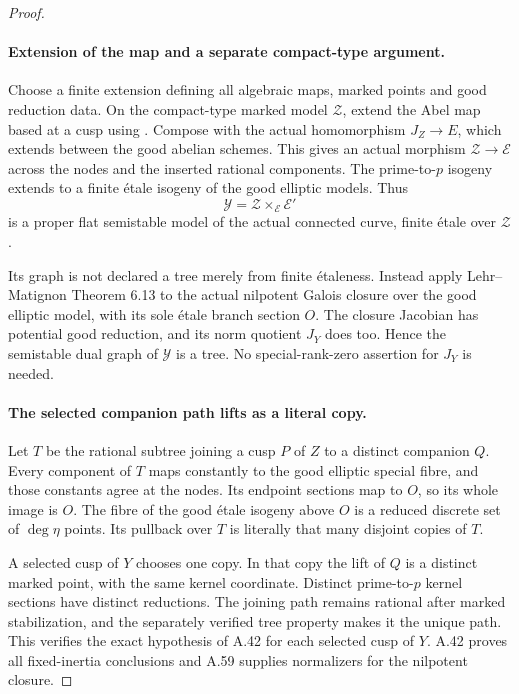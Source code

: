 \begin{proof}
\paragraph{Extension of the map and a separate compact-type argument.}
Choose a finite extension defining all algebraic maps,
marked points and good reduction data. On the compact-type
marked model \(\mathcal Z\), extend the Abel map based
at a cusp using \cite[Theorem 1.1 and Proposition 3.2]{fghDupuyRabinoff}.
Compose with the actual homomorphism \(J_Z\to E\),
which extends between the good abelian schemes. This gives
an actual morphism \(\mathcal Z\to\mathcal E\)
across the nodes and the inserted rational components.
The prime-to-\(p\) isogeny extends to a finite \'etale
isogeny of the good elliptic models. Thus
\[
 \mathcal Y=\mathcal Z\times_{\mathcal E}\mathcal E'
                                                               \tag{A.79.4}
\]
is a proper flat semistable model of the actual connected
curve, finite \'etale over \(\mathcal Z\).

Its graph is not declared a tree merely from finite
\'{e}taleness. Instead apply Lehr--Matignon Theorem 6.13
to the actual nilpotent Galois closure over the good
elliptic model, with its sole \'etale branch section
\(O\). The closure Jacobian has potential good reduction,
and its norm quotient \(J_Y\) does too. Hence the
semistable dual graph of \(\mathcal Y\) is a tree.
No special-rank-zero assertion for \(J_Y\) is needed.

\paragraph{The selected companion path lifts as a literal copy.}
Let \(T\) be the rational subtree joining a cusp
\(P\) of \(Z\) to a distinct companion \(Q\).
Every component of \(T\) maps constantly to the good
elliptic special fibre, and those constants agree at the
nodes. Its endpoint sections map to \(O\), so its
whole image is \(O\). The fibre of the good \'etale
isogeny above \(O\) is a reduced discrete set of
\(\deg\eta\) points. Its pullback over \(T\) is
literally that many disjoint copies of \(T\).

A selected cusp of \(Y\) chooses one copy. In that
copy the lift of \(Q\) is a distinct marked point,
with the same kernel coordinate. Distinct prime-to-\(p\)
kernel sections have distinct reductions. The joining
path remains rational after marked stabilization, and
the separately verified tree property makes it the
unique path. This verifies the exact hypothesis of A.42
for each selected cusp of \(Y\). A.42 proves all
fixed-inertia conclusions and A.59 supplies normalizers
for the nilpotent closure.


\end{proof}
